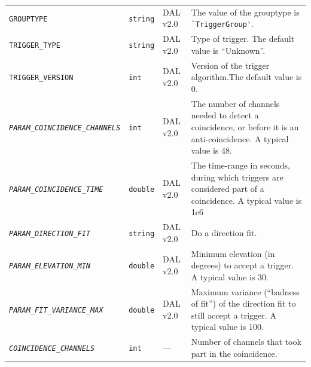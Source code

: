 \documentclass[a4paper,10pt,bibtotoc]{scrartcl}
\begin{document}
\begin{center}
  \tablelasttail{
    \hline
  }
  \begin{supertabular}{|lllp{5.25cm}|}
    \small \texttt{GROUPTYPE} & \verb|string| & DAL v2.0 & The value of the grouptype is \verb|`TriggerGroup'|.\\
    \small \texttt{TRIGGER\_TYPE} & \verb|string| & DAL v2.0 & Type of trigger. The default value is ``Unknown''.\\
    \small \texttt{TRIGGER\_VERSION} & \verb|int| & DAL v2.0 & Version of the trigger algorithm.The default value is 0.\\
    \small \textit{\texttt{PARAM\_COINCIDENCE\_CHANNELS}} & \verb|int| & DAL v2.0 & The number of channels needed to detect a coincidence, or before it is an anti-coincidence. A typical value is 48.\\
    \small \textit{\texttt{PARAM\_COINCIDENCE\_TIME}} & \verb|double|& DAL v2.0 & The time-range in seconds, during which triggers are considered part of a coincidence. A typical value is 1e6\\
    \small \textit{\texttt{PARAM\_DIRECTION\_FIT}} & \verb|string| & DAL v2.0 & Do a direction fit. \\
    \small \textit{\texttt{PARAM\_ELEVATION\_MIN}} & \verb|double| & DAL v2.0 & Minimum elevation (in degrees) to accept a trigger. A typical value is 30.\\
    \small \textit{\texttt{PARAM\_FIT\_VARIANCE\_MAX}} & \verb|double| & DAL v2.0 & Maximum variance (``badness of fit'') of the direction fit to still accept a trigger. A typical value is 100.\\
    \small \textit{\texttt{COINCIDENCE\_CHANNELS}} & \verb|int|  & --- & Number of channels that took part in the coincidence. \\

\end{supertabular}
\end{center}
\end{document}
